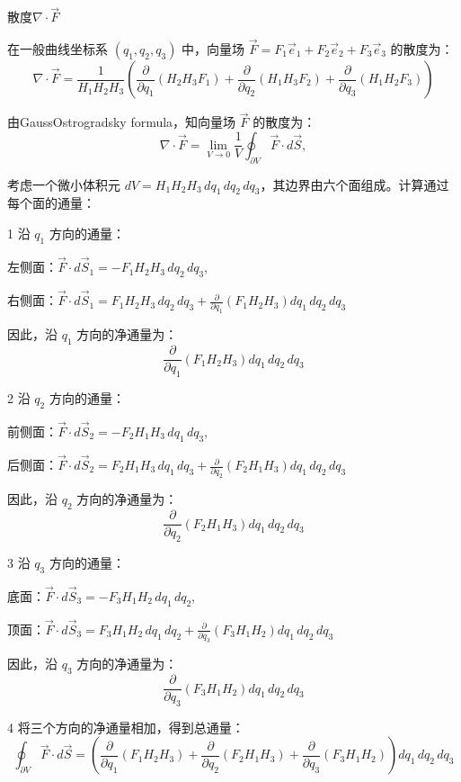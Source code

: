 \documentclass[12pt, a4paper, oneside, UTF8]{ctexbook}  %
\begin{document}
\begin{defn}
    散度$\nabla\cdot\vec{F}$
 
    在一般曲线坐标系 \((q_1, q_2, q_3)\) 中，向量场 \(\vec{F} = F_1 \vec{e}_1 + F_2 \vec{e}_2 + F_3 \vec{e}_3\) 的散度为：
    \[
    \nabla \cdot \vec{F} = \frac{1}{H_1 H_2 H_3} \left( \frac{\partial}{\partial q_1} (H_2 H_3 F_1) 
    + \frac{\partial}{\partial q_2} (H_1 H_3 F_2) + \frac{\partial}{\partial q_3} (H_1 H_2 F_3) \right)
    \]
\begin{tui}
    由Gauss\textminus Ostrogradsky formula，知向量场 \(\vec{F}\) 的散度为：
    \[
    \nabla \cdot \vec{F} = \lim_{V \to 0} \frac{1}{V} \oint_{\partial V} \vec{F} \cdot d\vec{S},
    \]
    
    考虑一个微小体积元 \(dV = H_1 H_2 H_3 \, dq_1 \, dq_2 \, dq_3\)，其边界由六个面组成。计算通过每个面的通量：

1 沿 \(q_1\) 方向的通量：
   
左侧面：\(\vec{F} \cdot d\vec{S}_1 = -F_1 H_2 H_3 \, dq_2 \, dq_3\),
   
   右侧面：\(\vec{F} \cdot d\vec{S}_1 = F_1 H_2 H_3 \, dq_2 \, dq_3 + \frac{\partial}{\partial q_1} (F_1 H_2 H_3) dq_1 \, dq_2 \, dq_3\)

   因此，沿 \(q_1\) 方向的净通量为：
   \[
   \frac{\partial}{\partial q_1} (F_1 H_2 H_3) dq_1 \, dq_2 \, dq_3
   \]

2 沿 \(q_2\) 方向的通量：
   
前侧面：\(\vec{F} \cdot d\vec{S}_2 = -F_2 H_1 H_3 \, dq_1 \, dq_3\),
   
   后侧面：\(\vec{F} \cdot d\vec{S}_2 = F_2 H_1 H_3 \, dq_1 \, dq_3 + \frac{\partial}{\partial q_2} (F_2 H_1 H_3) dq_1 \, dq_2 \, dq_3\)

   因此，沿 \(q_2\) 方向的净通量为：
   \[
   \frac{\partial}{\partial q_2} (F_2 H_1 H_3) dq_1 \, dq_2 \, dq_3
   \]

3 沿 \(q_3\) 方向的通量：
   
底面：\(\vec{F} \cdot d\vec{S}_3 = -F_3 H_1 H_2 \, dq_1 \, dq_2\),
   
   顶面：\(\vec{F} \cdot d\vec{S}_3 = F_3 H_1 H_2 \, dq_1 \, dq_2 + \frac{\partial}{\partial q_3} (F_3 H_1 H_2) dq_1 \, dq_2 \, dq_3\)

   因此，沿 \(q_3\) 方向的净通量为：
   \[
   \frac{\partial}{\partial q_3} (F_3 H_1 H_2) dq_1 \, dq_2 \, dq_3
   \]

   4 将三个方向的净通量相加，得到总通量：
\[
\oint_{\partial V} \vec{F} \cdot d\vec{S} = \left( \frac{\partial}{\partial q_1} (F_1 H_2 H_3) 
+ \frac{\partial}{\partial q_2} (F_2 H_1 H_3) + \frac{\partial}{\partial q_3} (F_3 H_1 H_2) \right) dq_1 \, dq_2 \, dq_3
\]


\end{tui}
\end{defn}
\end{document}
